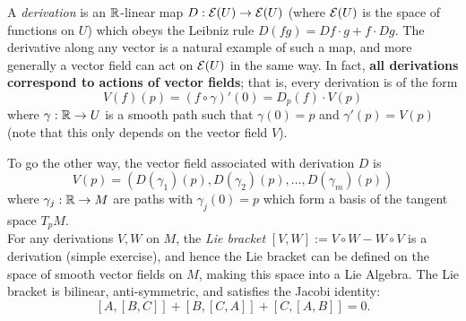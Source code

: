\documentclass{amsart}
\begin{document}
A \textit{derivation} is an $\mathbb{R}$-linear map $D:\mathcal{E}(U)\to \mathcal{E}(U)$ (where $\mathcal{E}(U)$ is the space of functions on $U$) which obeys the Leibniz rule $D(fg)=Df\cdot g  +f\cdot Dg$. The derivative along any vector is a natural example of such a map, and more generally a vector field can act on $\mathcal{E}(U)$ in the same way. In fact, \textbf{all derivations correspond to actions of vector fields}; that is, every derivation is of the form
$$
V(f)(p) = (f\circ \gamma)'(0) = D_p (f)\cdot V(p) 
$$
where $\gamma:\mathbb{R}\to U$ is a smooth path such that $\gamma(0)=p$ and $\gamma'(p)=V(p)$ (note that this only depends on the vector field $V$).

To go the other way, the vector field associated with derivation $D$ is
$$
V(p) = (D(\gamma_1)(p),D(\gamma_2)(p),\dots,D(\gamma_m)(p))
$$
where $\gamma_j:\mathbb{R}\to M$ are paths with $\gamma_j(0)=p$ which form a basis of the tangent space $T_pM$.\\ 

For any derivations $V,W$ on $M$, the \textit{Lie bracket} $[V,W]:=V\circ W-W\circ V$ is a derivation (simple exercise), and hence the Lie bracket can be defined on the space of smooth vector fields on $M$, making this space into a Lie Algebra. The Lie bracket is bilinear, anti-symmetric, and satisfies the Jacobi identity:
$$
[A,[B,C]]  + [B,[C,A]] + [C,[A,B]] = 0.
$$
\end{document}
